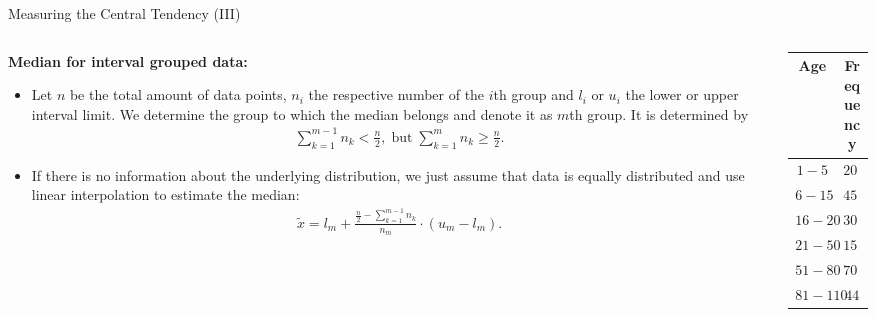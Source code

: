 \begin{frame}{Measuring the Central Tendency (III)}
	\begin{columns}
		\begin{column}{0.6\textwidth}
			\textbf{Median for interval grouped data:}
			\begin{itemize}[noitemsep]
				\item Let $n$ be the total amount of data points, $n_i$ the respective number of the $i$th group and $l_i$ or $u_i$ the lower or upper interval limit. We determine the group to which the median belongs and denote it as $m$th group. It is determined by
				      \begin{align}
					      \sum_{k=1}^{m-1}n_k < \frac{n}{2}, \; \text{but} \; \sum_{k=1}^{m} n_k \geq \frac{n}{2}.
				      \end{align}
				\item If there is no information about the underlying distribution, we just assume that data is equally distributed and use linear interpolation to estimate the median:
				      \begin{align}
					      \tilde{x} = l_m + \frac{\frac{n}{2}-\sum_{k=1}^{m-1}n_k}{n_m} \cdot (u_m-l_m).
				      \end{align}
			\end{itemize}
		\end{column}
		\begin{column}{0.3\textwidth}  %
			\begin{table}
				\begin{tabular}{|c|c|}
					Age      & Frequency \\ \hline
					$1-5$    & $200$     \\
					$6-15$   & $450$     \\
					$16-20$  & $300$     \\
					$21-50$  & $1500$    \\
					$51-80$  & $700$     \\
					$81-110$ & $44$
				\end{tabular}\\[0.5cm]
			\end{table}
		\end{column}
	\end{columns}
\end{frame}

